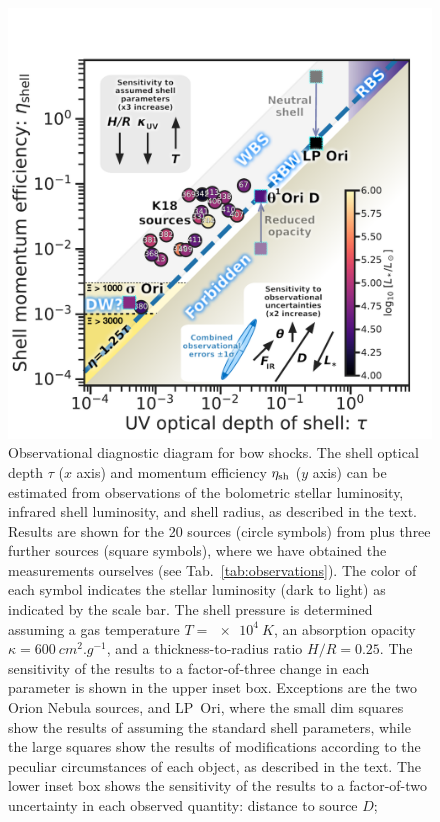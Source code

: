 \begin{figure}
  \centering
  \includegraphics[width=0.8\linewidth]{figs/All-sources-eta-tau}
  \caption[Observational diagnostic diagram]{Observational diagnostic
    diagram for bow shocks.  The shell optical depth \(\tau\) (\(x\)
    axis) and momentum efficiency \(\eta_{\text{sh}}\) (\(y\) axis) can be
    estimated from observations of the bolometric stellar luminosity,
    infrared shell luminosity, and shell radius, as described in the
    text.  Results are shown for the 20 sources (circle symbols) from
    \citet{Kobulnicky:2018a} plus three further sources (square
    symbols), where we have obtained the measurements ourselves (see
    Tab.~\ref{tab:observations}).  The color of each symbol indicates
    the stellar luminosity (dark to light) as indicated by the scale
    bar. The shell pressure is determined assuming a gas temperature
    \(T = \SI{e4}{K}\), an absorption opacity
    \(\kappa = \SI{600}{cm^2.g^{-1}}\), and a thickness-to-radius ratio
    \(H/R = 0.25\).  The sensitivity of the results to a
    factor-of-three change in each parameter is shown in the upper
    inset box.  Exceptions are the two Orion Nebula sources, \thD{}
    and LP~Ori, where the small dim squares show the results of
    assuming the standard shell parameters, while the large squares
    show the results of modifications according to the peculiar
    circumstances of each object, as described in the text.  The lower
    inset box shows the sensitivity of the results to a factor-of-two
    uncertainty in each observed quantity: distance to source \(D\);
}
\end{figure}

